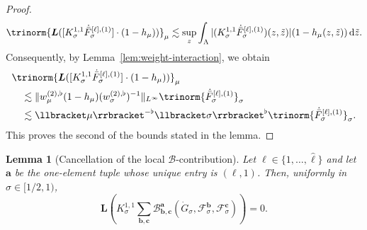 \documentclass{article}
\numberwithin{equation}{section}
\newcommand{\mathd}{\mathrm{d}}
\theoremstyle{plain}
\newtheorem{lemma}[theorem]{Lemma}
\theoremstyle{definition}
\begin{document}
\begin{proof}
  
  \[ \trinorm{ \boldsymbol{L} ([K^{1, 1}_{\sigma}
     \dot{\bar{F}}_{\sigma}^{[\ell], (1)}] \cdot (1 - h_{\mu}))
     }_{\mu} \lesssim
     \sup_{z} \int_{\Lambda} | (K^{1, 1}_{\sigma}
     \dot{\bar{F}}_{\sigma}^{[\ell], (1)}) (z, \tilde{z}) |  (1 - h_{\mu} (z,
     \tilde{z}))\,\mathd \tilde{z} . \]
  Consequently, by Lemma~\ref{lem:weight-interaction}, we obtain
  \begin{align*}
    &\trinorm{ \boldsymbol{L} ([K^{1, 1}_{\sigma}
    \dot{\bar{F}}_{\sigma}^{[\ell], (1)}] \cdot (1 - h_{\mu}))
    }_{\mu}\\
    &\quad \lesssim
    \| w^{(2), \flat}_{\mu} (1 - h_{\mu})
    (w^{(2), \flat}_{\sigma})^{- 1} \|_{L^{\infty}}
    \trinorm{ \dot{\bar{F}}_{\sigma}^{[\ell], (1)}
    }_{\sigma}\\
    &\quad \lesssim
    \llbracket \mu \rrbracket^{- \flat}
    \llbracket \sigma \rrbracket^{\flat}
    \trinorm{ \dot{\bar{F}}_{\sigma}^{[\ell], (1)}
    }_{\sigma} .
  \end{align*}
  This proves the second of the bounds stated in the lemma.
\end{proof}

\begin{lemma}[Cancellation of the local $\mathcal B$-contribution]
  \label{lem:local-B-cancellation}
  Let $\ell\in\{1,\ldots,\hat{\ell}\}$ and let $\boldsymbol a$ be the
  one-element tuple whose unique entry is $(\ell,1)$. Then, uniformly in
  $\sigma\in[1/2,1)$,
  \begin{equation}
    \boldsymbol L\left(
      K^{1,1}_\sigma
      \sum_{\boldsymbol b,\boldsymbol c}
      \mathcal B^{\boldsymbol a}_{\boldsymbol b,\boldsymbol c}
      (\dot G_\sigma,
       \mathcal F^{\boldsymbol b}_\sigma,
       \mathcal F^{\boldsymbol c}_\sigma)
    \right)=0.
    \label{eq:local-B-cancellation}
  \end{equation}
\end{lemma}
\end{document}
